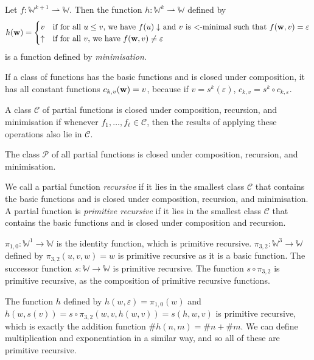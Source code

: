 Let \( f \colon \mathbb W^{k+1} \rightharpoonup \mathbb W \).
Then the function \( h \colon \mathbb W^k \rightharpoonup \mathbb W \) defined by
\[ h(\vb w) = \begin{cases}
	v & \text{if for all \( u \leq v \), we have \( f(u) \downarrow \) and \( v \) is \( < \)-minimal such that \( f(\vb w, v) = \varepsilon \)} \\
	\uparrow & \text{if for all \( v \), we have \( f(\vb w, v) \neq \varepsilon \)}
\end{cases} \]
is a function defined by \emph{minimisation}.
\begin{remark}
	If a class of functions has the basic functions and is closed under composition, it has all constant functions \( c_{k,v}(\vb w) = v \), because if \( v = s^k(\varepsilon) \), \( c_{k,v} = s^k \circ c_{k,\varepsilon} \).
\end{remark}
\begin{definition}
	A class \( \mathcal C \) of partial functions is closed under composition, recursion, and minimisation if whenever \( f_1, \dots, f_\ell \in \mathcal C \), then the results of applying these operations also lie in \( \mathcal C \).
\end{definition}
\begin{remark}
	The class \( \mathcal P \) of all partial functions is closed under composition, recursion, and minimisation.
\end{remark}
\begin{definition}
	We call a partial function \emph{recursive} if it lies in the smallest class \( \mathcal C \) that contains the basic functions and is closed under composition, recursion, and minimisation.
	A partial function is \emph{primitive recursive} if it lies in the smallest class \( \mathcal C \) that contains the basic functions and is closed under composition and recursion.
\end{definition}
\begin{example}
	\( \pi_{1,0} \colon \mathbb W^1 \to \mathbb W \) is the identity function, which is primitive recursive.
	\( \pi_{3,2} \colon \mathbb W^3 \to \mathbb W \) defined by \( \pi_{3,2}(u,v,w) = w \) is primitive recursive as it is a basic function.
	The successor function \( s \colon \mathbb W \to \mathbb W \) is primitive recursive.
	The function \( s \circ \pi_{3,2} \) is primitive recursive, as the composition of primitive recursive functions.

	The function \( h \) defined by \( h(w,\varepsilon) = \pi_{1,0}(w) \) and \( h(w,s(v)) = s \circ \pi_{3,2}(w,v,h(w,v)) = s(h,w,v) \) is primitive recursive, which is exactly the addition function \( \# h(n,m) = \# n + \# m \).
	We can define multiplication and exponentiation in a similar way, and so all of these are primitive recursive.
\end{example}
